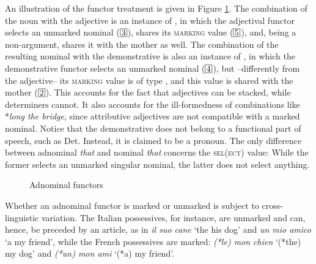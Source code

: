 \documentclass[output=paper
                ,modfonts
                ,nonflat
	        ,collection
	        ,collectionchapter
	        ,collectiontoclongg
 	        ,biblatex
                ,babelshorthands
                ,newtxmath
                ,draftmode
                ,colorlinks, citecolor=brown
]{./langsci/langscibook}
\begin{document}
An illustration of the functor treatment is given in Figure \ref{markyy}. 
The combination of the noun with the adjective is an instance of , 
in which the adjectival functor selects an unmarked nominal ($\avmbox{3}$),  
shares its \textsc{marking} value ($\avmbox{5}$), and, being a non-argument, 
shares it with the mother as well. 
The combination of the resulting nominal with the demonstrative is also 
an instance of ,
in which the demonstrative functor selects an unmarked nominal ($\avmbox{4}$), 
but --differently from the adjective-- its \textsc{marking} value is of type 
, and this value is shared with the mother ($\avmbox{2}$).    
This accounts for the fact that adjectives can be stacked, while  
determiners cannot. It also accounts for the ill-formedness of combinations like 
*\emph{long the bridge}, since attributive adjectives are not compatible with a
marked nominal.  
Notice that the demonstrative does not belong to a functional part of speech, such as Det.
Instead, it is claimed to be a pronoun. The only difference between adnominal \emph{that} and nominal
\emph{that} concerns the \textsc{sel(ect)} value: While the former selects an unmarked singular nominal, 
the latter does not select anything.      

\begin{figure}
	\centering
{}
	\caption{\label{markyy} Adnominal functors}
\end{figure}

Whether an adnominal functor is marked or unmarked is subject to cross-linguistic variation. 
The Italian possessives, for instance, are unmarked and can, hence, be preceded 
by an article, as in \emph{il suo cane} `the his dog' and \emph{un mio amico} `a my friend', 
while the French possessives are marked: \emph{(*le) mon chien} `(*the) my dog' 
and \emph{(*un) mon ami} `(*a) my friend'. 
\end{document}
